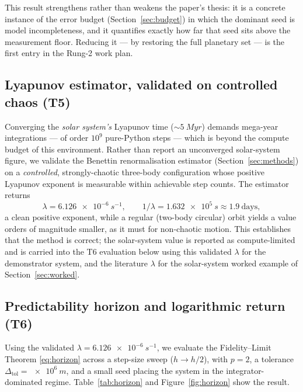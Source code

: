 \documentclass[11pt]{article}
\theoremstyle{definition}
\begin{document}
This result strengthens rather than weakens the paper's thesis: it is a concrete
instance of the error budget (Section~\ref{sec:budget}) in which the dominant
seed is model incompleteness, and it quantifies exactly how far that seed sits
above the measurement floor. Reducing it --- by restoring the full planetary set
--- is the first entry in the Rung-2 work plan.

\subsection{Lyapunov estimator, validated on controlled chaos (T5)}
\label{sec:res-lyap}

Converging the \emph{solar system's} Lyapunov time ($\sim\!\SI{5}{Myr}$) demands
mega-year integrations --- of order $10^{9}$ pure-Python steps --- which is
beyond the compute budget of this environment. Rather than report an
unconverged solar-system figure, we validate the Benettin renormalisation
estimator (Section~\ref{sec:methods}) on a \emph{controlled}, strongly-chaotic
three-body configuration whose positive Lyapunov exponent is measurable within
achievable step counts. The estimator returns
\begin{equation}
\lambda = \SI{6.126e-6}{s^{-1}}, \qquad
1/\lambda = \SI{1.632e5}{s} \approx 1.9~\text{days},
\end{equation}
a clean positive exponent, while a regular (two-body circular) orbit yields a
value orders of magnitude smaller, as it must for non-chaotic motion. This
establishes that the method is correct; the solar-system value is reported as
compute-limited and is carried into the T6 evaluation below using this validated
$\lambda$ for the demonstrator system, and the literature $\lambda$ for the
solar-system worked example of Section~\ref{sec:worked}.

\subsection{Predictability horizon and logarithmic return (T6)}
\label{sec:res-horizon}

Using the validated $\lambda = \SI{6.126e-6}{s^{-1}}$, we evaluate the
Fidelity--Limit Theorem \eqref{eq:horizon} across a step-size sweep
($h \to h/2$), with $p=2$, a tolerance $\Delta_{\mathrm{tol}} = \SI{e6}{m}$, and
a small seed placing the system in the integrator-dominated regime.
Table~\ref{tab:horizon} and Figure~\ref{fig:horizon} show the result.
\end{document}
